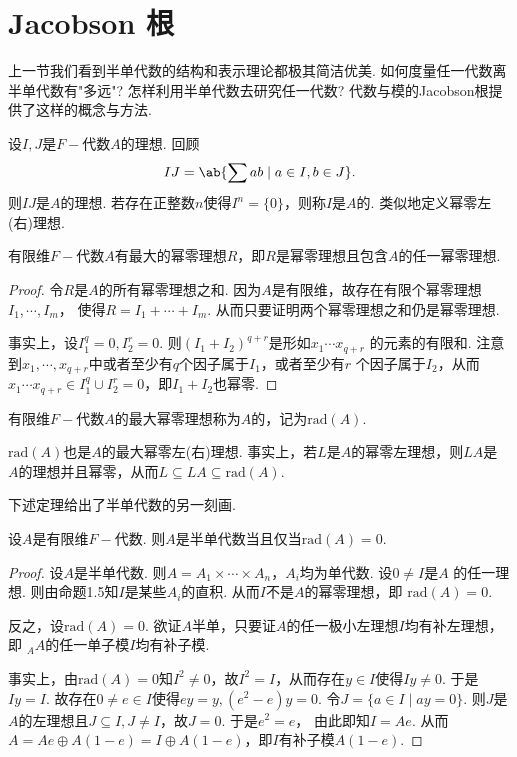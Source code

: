 \section{Jacobson 根}

上一节我们看到半单代数的结构和表示理论都极其简洁优美. 如何度量任一代数离半单代数有"多远"?
怎样利用半单代数去研究任一代数? 代数与模的Jacobson根提供了这样的概念与方法.

设$I, J$是$F-\!\!$代数$A$的理想. 回顾
\[ IJ = \ab\{\sum ab \mid a \in I, b \in J\}. \]
则$IJ$是$A$的理想. 若存在正整数$n$使得$I^n = \{0\}$，则称$I$是$A$的.
类似地定义幂零左(右)理想.

\begin{lemma}
    有限维$F-\!\!$代数$A$有最大的幂零理想$R$，即$R$是幂零理想且包含$A$的任一幂零理想.
\end{lemma}

\begin{proof}
    令$R$是$A$的所有幂零理想之和. 因为$A$是有限维，故存在有限个幂零理想$I_1, \cdots, I_m$，
    使得$R = I_1 + \cdots + I_m$. 从而只要证明两个幂零理想之和仍是幂零理想.\par
    事实上，设$I_1^q = 0, I_2^r = 0$. 则$(I_1 + I_2)^{q+r}$是形如$x_1 \cdots x_{q+r}$
    的元素的有限和. 注意到$x_1, \cdots, x_{q+r}$中或者至少有$q$个因子属于$I_1$，或者至少有$r$
    个因子属于$I_2$，从而$x_1 \cdots x_{q+r} \in I_1^q \cup I_2^r = 0$，即$I_1 + I_2$也幂零.
\end{proof}

\begin{definition}[Jacobson根]
    有限维$F-\!\!$代数$A$的最大幂零理想称为$A$的，记为$\mathrm{rad}(A)$.
\end{definition}

$\mathrm{rad}(A)$也是$A$的最大幂零左(右)理想. 事实上，若$L$是$A$的幂零左理想，则$LA$是
$A$的理想并且幂零，从而$L \subseteq LA \subseteq \mathrm{rad}(A)$.\par
下述定理给出了半单代数的另一刻画.

\begin{theorem}
    设$A$是有限维$F-\!\!$代数. 则$A$是半单代数当且仅当$\mathrm{rad}(A) = 0$.
\end{theorem}

\begin{proof}
    设$A$是半单代数. 则$A = A_1 \times \cdots \times A_n$，$A_i$均为单代数. 设$0 \neq I$是$A$
    的任一理想. 则由命题1.5知$I$是某些$A_i$的直积. 从而$I$不是$A$的幂零理想，即
    $\mathrm{rad}(A) = 0$.\par
    反之，设$\mathrm{rad}(A) = 0$. 欲证$A$半单，只要证$A$的任一极小左理想$I$均有补左理想，即
    ${}_A A$的任一单子模$I$均有补子模.\par
    事实上，由$\mathrm{rad}(A) = 0$知$I^2 \neq 0$，故$I^2 = I$，从而存在$y \in I$使得$Iy \neq
    0$. 于是$Iy = I$. 故存在$0 \neq e \in I$使得$ey = y, (e^2 - e)y = 0$. 令$J = \{a \in I \mid
    ay = 0\}$. 则$J$是$A$的左理想且$J \subseteq I, J \neq I$，故$J = 0$. 于是$e^2 = e$，
    由此即知$I = Ae$. 从而$A = Ae \oplus A(1-e) = I \oplus A(1-e)$，即$I$有补子模$A(1-e)$.
\end{proof}

